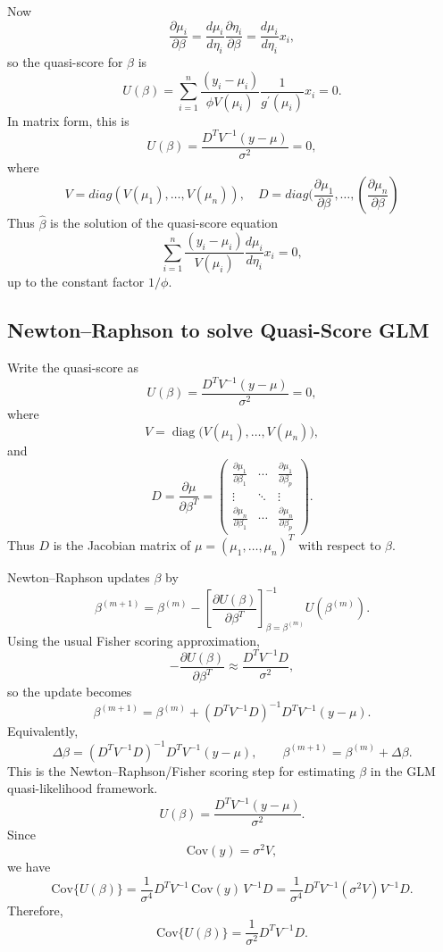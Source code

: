 \documentclass[11pt]{article}
\theoremstyle{definition}
\begin{document}
Now
\[
\frac{\partial \mu_i}{\partial \beta}
=
\frac{d\mu_i}{d\eta_i}\frac{\partial \eta_i}{\partial \beta}
=
\frac{d\mu_i}{d\eta_i}x_i,
\]
so the quasi-score for $\beta$ is
\[
U(\beta)
=
\sum_{i=1}^n
\frac{(y_i-\mu_i)}{\phi V(\mu_i)}
\frac{1}{g^\prime(\mu_i)}x_i
=
0.
\]
In matrix form, this is
\[
U(\beta)
=
\frac{D^TV^{-1}(y-\mu)}{\sigma^2}=0,
\]
where
\[
V = diag(V(\mu_1),\dots,V(\mu_n)),\quad D = diag(\frac{\partial \mu_1}{\partial \beta},\dots,(\frac{\partial \mu_n}{\partial \beta})
\]
Thus $\hat\beta$ is the solution of the quasi-score equation
\[
\sum_{i=1}^n
\frac{(y_i-\mu_i)}{V(\mu_i)}
\frac{d\mu_i}{d\eta_i}x_i
=
0,
\]
up to the constant factor $1/\phi$.
\subsection{Newton--Raphson to solve Quasi-Score GLM}

Write the quasi-score as
\[
U(\beta)
=
\frac{D^T V^{-1}(y-\mu)}{\sigma^2}
=
0,
\]
where
\[
V=\operatorname{diag}\bigl(V(\mu_1),\dots,V(\mu_n)\bigr),
\]
and
\[
D=\frac{\partial \mu}{\partial \beta^T}
=
\begin{pmatrix}
\frac{\partial \mu_1}{\partial \beta_1} & \cdots & \frac{\partial \mu_1}{\partial \beta_p}\\
\vdots & \ddots & \vdots\\
\frac{\partial \mu_n}{\partial \beta_1} & \cdots & \frac{\partial \mu_n}{\partial \beta_p}
\end{pmatrix}.
\]
Thus $D$ is the Jacobian matrix of $\mu=(\mu_1,\dots,\mu_n)^T$ with respect to $\beta$.

Newton--Raphson updates $\beta$ by
\[
\beta^{(m+1)}
=
\beta^{(m)}
-
\left[
\frac{\partial U(\beta)}{\partial \beta^T}
\right]^{-1}_{\beta=\beta^{(m)}}
U(\beta^{(m)}).
\]
Using the usual Fisher scoring approximation,
\[
-\frac{\partial U(\beta)}{\partial \beta^T}
\approx
\frac{D^T V^{-1} D}{\sigma^2},
\]
so the update becomes
\[
\beta^{(m+1)}
=
\beta^{(m)}
+
(D^T V^{-1}D)^{-1}D^T V^{-1}(y-\mu).
\]
Equivalently,
\[
\Delta\beta
=
(D^T V^{-1}D)^{-1}D^T V^{-1}(y-\mu),
\qquad
\beta^{(m+1)}=\beta^{(m)}+\Delta\beta.
\]
This is the Newton--Raphson/Fisher scoring step for estimating $\beta$ in the GLM quasi-likelihood framework.
\[
U(\beta)=\frac{D^T V^{-1}(y-\mu)}{\sigma^2}.
\]
Since
\[
\mathrm{Cov}(y)=\sigma^2 V,
\]
we have
\[
\mathrm{Cov}\{U(\beta)\}
=
\frac{1}{\sigma^4}D^T V^{-1}\,\mathrm{Cov}(y)\,V^{-1}D
=
\frac{1}{\sigma^4}D^T V^{-1}(\sigma^2 V)V^{-1}D.
\]
Therefore,
\[
\mathrm{Cov}\{U(\beta)\}
=
\frac{1}{\sigma^2}D^T V^{-1}D.
\]
\newpage
\end{document}
